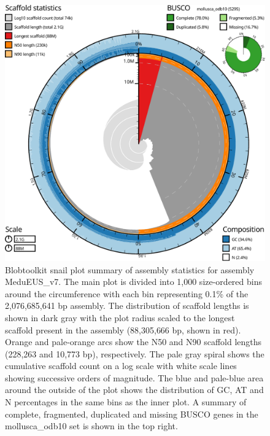 \documentclass[11pt, a4paper]{article}
\begin{document}
\begin{figure}
	\includegraphics[width=\linewidth]{figures/btk_snail_MeduEUS_v7}
	\caption{Blobtoolkit snail plot summary of assembly statistics for assembly MeduEUS\_v7. The main plot is divided into 1,000 size-ordered bins around the circumference with each bin representing 0.1\% of the 2,076,685,641 bp assembly. The distribution of scaffold lengths is shown in dark gray with the plot radius scaled to the longest scaffold present in the assembly (88,305,666 bp, shown in red). Orange and pale-orange arcs show the N50 and N90 scaffold lengths (228,263 and 10,773 bp), respectively. The pale gray spiral shows the cumulative scaffold count on a log scale with white scale lines showing successive orders of magnitude. The blue and pale-blue area around the outside of the plot shows the distribution of GC, AT and N percentages in the same bins as the inner plot. A summary of complete, fragmented, duplicated and missing BUSCO genes in the mollusca\_odb10 set is shown in the top right. }
	\label{supfig:btk-snail-MeduEUS}
\end{figure}
\end{document}
